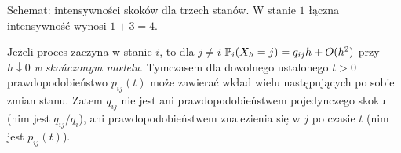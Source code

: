 \begin{center}
\par\smallskip\small Schemat: intensywności skoków dla trzech stanów.
W stanie $1$ łączna intensywność wynosi $1+3=4$.
\end{center}


\begin{uwaga}
Jeżeli proces zaczyna w stanie $i$, to dla $j\ne i$
$\mathbb{P}_i(X_h=j)=q_{ij}h+O(h^2)$ przy $h\downarrow0$
\emph{w skończonym modelu}. Tymczasem dla dowolnego
ustalonego $t>0$ prawdopodobieństwo $p_{ij}(t)$ może zawierać
wkład wielu następujących po sobie zmian stanu.
Zatem $q_{ij}$ nie jest ani prawdopodobieństwem pojedynczego
skoku (nim jest $q_{ij}/q_i$), ani prawdopodobieństwem
znalezienia się w $j$ po czasie $t$ (nim jest $p_{ij}(t)$).
\end{uwaga}

